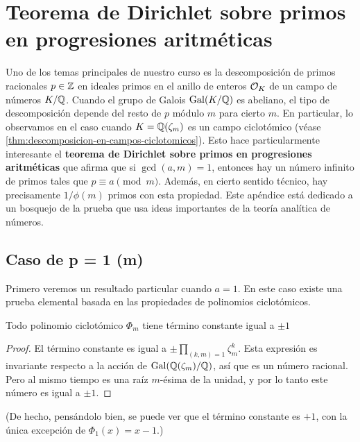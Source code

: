 \chapter{Teorema de Dirichlet sobre primos en progresiones aritméticas}
\label{ap:Dirichlet}

Uno de los temas principales de nuestro curso es la descomposición de primos
racionales $p \in \mathbb{Z}$ en ideales primos en el anillo de enteros $\mathcal{O}_K$ de un
campo de números $K/\mathbb{Q}$. Cuando el grupo de Galois $\operatorname{Gal} (K/\mathbb{Q})$ es abeliano,
el tipo de descomposición depende del resto de $p$ módulo $m$ para cierto $m$.
En particular, lo observamos en el caso cuando $K = \mathbb{Q} (\zeta_m)$ es un campo
ciclotómico (véase \ref{thm:descomposicion-en-campos-ciclotomicos}).
Esto hace particularmente interesante el
\textbf{teorema de Dirichlet sobre primos en progresiones aritméticas} que
afirma que si $\gcd (a,m) = 1$, entonces hay un número infinito de primos tales
que $p \equiv a \pmod{m}$. Además, en cierto sentido técnico, hay precisamente
$1/\phi(m)$ primos con esta propiedad. Este apéndice está dedicado a un bosquejo
de la prueba que usa ideas importantes de la teoría analítica de números.


\section{Caso de p = 1 (m)}

Primero veremos un resultado particular cuando $a = 1$. En este caso existe una
prueba elemental basada en las propiedades de polinomios ciclotómicos.

\begin{lema}
  Todo polinomio ciclotómico $\Phi_m$ tiene término constante igual a $\pm 1$

  \begin{proof}
    El término constante es igual a $\pm\prod_{(k,m) = 1} \zeta_m^k$. Esta
    expresión es invariante respecto a la acción de $\operatorname{Gal} (\mathbb{Q} (\zeta_m)/\mathbb{Q})$,
    así que es un número racional. Pero al mismo tiempo es una raíz $m$-ésima
    de la unidad, y por lo tanto este número es igual a $\pm 1$.
  \end{proof}
\end{lema}

(De hecho, pensándolo bien, se puede ver que el término constante es $+1$, con
la única excepción de $\Phi_1 (x) = x - 1$.)

